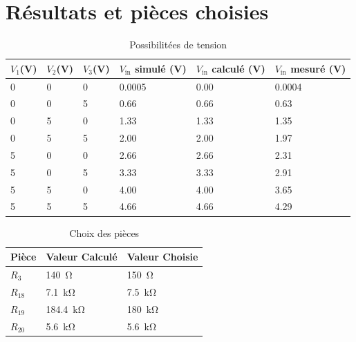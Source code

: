 \documentclass[a11paper, 11pt]{article}
\newcommand{\todo}[1]{\begin{color}{Red}\textbf{TODO:} #1\end{color}}
\begin{document}
\section{Résultats et pièces choisies}

\begin{table}[H]
	\centering
	\caption{Possibilitées de tension}
	\label{tab:results}
	\begin{tabular}{llllll}
		\toprule
		$V_1$(\si{\V})
		         &
		$V_2$(\si{\V})
		         &
		$V_3$(\si{\V})
		         &
		$V_{\textrm{in}}$ simulé (\si{\V})
		         &
		$V_{\textrm{in}}$ calculé (\si{\V})
		         &
		$V_{\textrm{in}}$ mesuré (\si{\V})                                           \\
		\midrule\midrule
		\SI{0}{} & \SI{0}{} & \SI{0}{} & \SI{0.0005}{} & \SI{0.00}{} & \SI{0.0004}{} \\
		\SI{0}{} & \SI{0}{} & \SI{5}{} & \SI{0.66}{}   & \SI{0.66}{} & \SI{0.63}{}   \\
		\SI{0}{} & \SI{5}{} & \SI{0}{} & \SI{1.33}{}   & \SI{1.33}{} & \SI{1.35}{}   \\
		\SI{0}{} & \SI{5}{} & \SI{5}{} & \SI{2.00}{}   & \SI{2.00}{} & \SI{1.97}{}   \\
		\SI{5}{} & \SI{0}{} & \SI{0}{} & \SI{2.66}{}   & \SI{2.66}{} & \SI{2.31}{}   \\
		\SI{5}{} & \SI{0}{} & \SI{5}{} & \SI{3.33}{}   & \SI{3.33}{} & \SI{2.91}{}   \\
		\SI{5}{} & \SI{5}{} & \SI{0}{} & \SI{4.00}{}   & \SI{4.00}{} & \SI{3.65}{}   \\
		\SI{5}{} & \SI{5}{} & \SI{5}{} & \SI{4.66}{}   & \SI{4.66}{} & \SI{4.29}{}   \\
		\bottomrule
	\end{tabular}
\end{table}

\begin{table}[H]
	\caption{Choix des pièces}
	\label{tab:parts}
	\centering
	\begin{tabular}{lll}
		\toprule Pièce & Valeur Calculé        & Valeur Choisie      \\
		\midrule\midrule
		$R_3$          & \SI{140}{\ohm}        & \SI{150}{\ohm}      \\
		$R_{18}$       & \SI{7.1}{\kilo\ohm}   & \SI{7.5}{\kilo\ohm} \\
		$R_{19}$       & \SI{184.4}{\kilo\ohm} & \SI{180}{\kilo\ohm} \\
		$R_{20}$       & \SI{5.6}{\kilo\ohm}   & \SI{5.6}{\kilo\ohm} \\
		\bottomrule
	\end{tabular}
\end{table}
\end{document}
